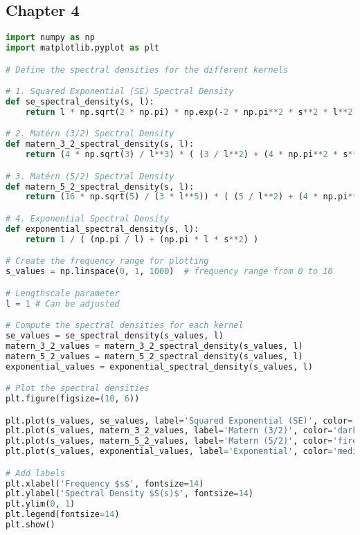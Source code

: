 \documentclass[12pt,a4paper]{article}
\begin{document}
\subsection{Chapter 4}
\label{Chapter 4}


\vspace{10pt}
\begin{lstlisting}[language=python, caption={Code of the Creation of Figures \ref{fig:Spectral density kernel plot}}]
import numpy as np
import matplotlib.pyplot as plt

# Define the spectral densities for the different kernels

# 1. Squared Exponential (SE) Spectral Density
def se_spectral_density(s, l):
    return l * np.sqrt(2 * np.pi) * np.exp(-2 * np.pi**2 * s**2 * l**2)

# 2. Matérn (3/2) Spectral Density
def matern_3_2_spectral_density(s, l):
    return (4 * np.sqrt(3) / l**3) * ( (3 / l**2) + (4 * np.pi**2 * s**2) )**(-2)

# 3. Matérn (5/2) Spectral Density
def matern_5_2_spectral_density(s, l):
    return (16 * np.sqrt(5) / (3 * l**5)) * ( (5 / l**2) + (4 * np.pi**2 * s**2) )**(-3)

# 4. Exponential Spectral Density
def exponential_spectral_density(s, l):
    return 1 / ( (np.pi / l) + (np.pi * l * s**2) )

# Create the frequency range for plotting
s_values = np.linspace(0, 1, 1000)  # frequency range from 0 to 10

# Lengthscale parameter
l = 1 # Can be adjusted

# Compute the spectral densities for each kernel
se_values = se_spectral_density(s_values, l)
matern_3_2_values = matern_3_2_spectral_density(s_values, l)
matern_5_2_values = matern_5_2_spectral_density(s_values, l)
exponential_values = exponential_spectral_density(s_values, l)

# Plot the spectral densities
plt.figure(figsize=(10, 6))

plt.plot(s_values, se_values, label='Squared Exponential (SE)', color='steelblue', linewidth=3)
plt.plot(s_values, matern_3_2_values, label='Matern (3/2)', color='darkorange', linewidth=3)
plt.plot(s_values, matern_5_2_values, label='Matern (5/2)', color='firebrick', linewidth=3)
plt.plot(s_values, exponential_values, label='Exponential', color='mediumpurple', linewidth=3)

# Add labels 
plt.xlabel('Frequency $s$', fontsize=14)
plt.ylabel('Spectral Density $S(s)$', fontsize=14)
plt.ylim(0, 1)
plt.legend(fontsize=14)
plt.show()
\end{lstlisting}
\end{document}
